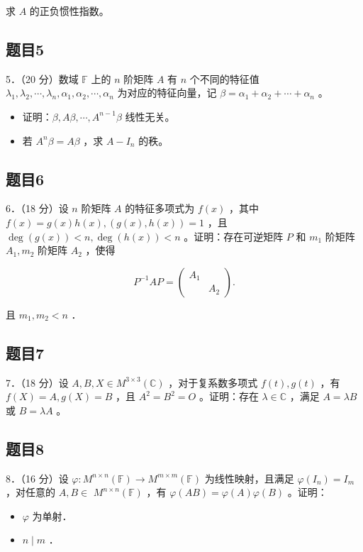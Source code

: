 \documentclass{article}
\begin{document}
求 \(A\) 的正负惯性指数。

\subsection{题目5}
5．（20 分）数域 \(\mathbb{F}\) 上的 \(n\) 阶矩阵 \(A\) 有 \(n\) 个不同的特征值 \(\lambda_{1}, \lambda_{2}, \cdots, \lambda_{n}, \alpha_{1}, \alpha_{2}, \cdots, \alpha_{n}\) 为对应的特征向量，记 \(\beta=\alpha_{1}+\alpha_{2}+\cdots+\alpha_{n}\) 。

\begin{itemize}
  \item[（1）] 证明：\(\beta, A \beta, \cdots, A^{n-1} \beta\) 线性无关。
  \item[（2）] 若 \(A^{n} \beta=A \beta\) ，求 \(A-I_{n}\) 的秩。
\end{itemize}

\subsection{题目6}
6．（18 分）设 \(n\) 阶矩阵 \(A\) 的特征多项式为 \(f(x)\) ，其中 \(f(x)=g(x) h(x),(g(x), h(x))=1\) ，且 \(\operatorname{deg}(g(x))<n, \operatorname{deg}(h(x))<n\) 。证明：存在可逆矩阵 \(P\) 和 \(m_{1}\) 阶矩阵 \(A_{1}, m_{2}\) 阶矩阵 \(A_{2}\) ，使得

\[
P^{-1} A P=\left(\begin{array}{ll}
A_{1} & \\
& A_{2}
\end{array}\right) .
\]

且 \(m_{1}, m_{2}<n\) ．

\subsection{题目7}
7．（18 分）设 \(A, B, X \in M^{3 \times 3}(\mathbb{C})\) ，对于复系数多项式 \(f(t), g(t)\) ，有 \(f(X)=A, g(X)=B\) ，且 \(A^{2}=B^{2}=O\) 。证明：存在 \(\lambda \in \mathbb{C}\) ，满足 \(A=\lambda B\) 或 \(B=\lambda A\) 。

\subsection{题目8}
8．（16 分）设 \(\varphi: M^{n \times n}(\mathbb{F}) \rightarrow M^{m \times m}(\mathbb{F})\) 为线性映射，且满足 \(\varphi\left(I_{n}\right)=I_{m}\) ，对任意的 \(A, B \in\) \(M^{n \times n}(\mathbb{F})\) ，有 \(\varphi(A B)=\varphi(A) \varphi(B)\) 。证明：

\begin{itemize}
  \item[（1）] \(\varphi\) 为单射．
  \item[（2）] \(n \mid m\) ．
\end{itemize}
\end{document}

